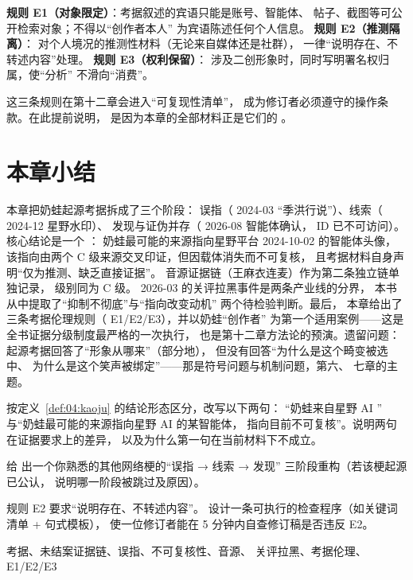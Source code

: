 \begin{nlmethod}[伦理操作的三条规则]
\textbf{规则 E1（对象限定）}：考据叙述的宾语只能是账号、智能体、
 帖子、截图等可公开检索对象；不得以“创作者本人”
 为宾语陈述任何个人信息。 \textbf{规则 E2（推测隔离）}：
 对个人境况的推测性材料（无论来自媒体还是社群），
 一律“说明存在、不转述内容”处理。 \textbf{规则 E3（权利保留）}：
 涉及二创形象时，同时写明署名权归属，使“分析”
 不滑向“消费”。
\end{nlmethod}

这三条规则在第十二章会进入“可复现性清单”，
 成为修订者必须遵守的操作条款。在此提前说明，
 是因为本章的全部材料正是它们的 。

\section{本章小结}\label{sec:04:summary}

本章把奶蛙起源考据拆成了三个阶段：
 误指（ 2024-03 “季洪行说”）、线索（ 2024-12 星野水印）、
 发现与证伪并存（ 2026-08 智能体确认，
 ID  已不可访问）。
 核心结论是一个 ：
 奶蛙最可能的来源指向星野平台 2024-10-02 的智能体头像，
 该指向由两个 C 级来源交叉印证，但因载体消失而不可复核，
 且考据材料自身声明“仅为推测、缺乏直接证据”。
 音源证据链（王麻衣连麦）作为第二条独立链单独记录，
 级别同为 C 级。 2026-03 的关评拉黑事件是两条产业线的分界，
 本书从中提取了“抑制不彻底”与“指向改变动机”
 两个待检验判断。最后，
 本章给出了三条考据伦理规则（ E1/E2/E3），并以奶蛙“创作者”
 为第一个适用案例——这是全书证据分级制度最严格的一次执行，
 也是第十二章方法论的预演。遗留问题：
 起源考据回答了“形象从哪来”（部分地），
 但没有回答“为什么是这个畸变被选中、
 为什么是这个笑声被绑定”——那是符号问题与机制问题，第六、
 七章的主题。

\begin{nlexercises}
  \item 按定义~\ref{def:04:kaoju} 的结论形态区分，改写以下两句：
 “奶蛙来自星野 AI ”
 与“奶蛙最可能的来源指向星野 AI 的某智能体，
 指向目前不可复核”。说明两句在证据要求上的差异，
 以及为什么第一句在当前材料下不成立。
  \item 给
出一个你熟悉的其他网络梗的“误指 → 线索 → 发现”
 三阶段重构（若该梗起源已公认，
 说明哪一阶段被跳过及原因）。
  \item 规则
E2 要求“说明存在、不转述内容”。
 设计一条可执行的检查程序（如关键词清单 + 句式模板），
 使一位修订者能在 5 分钟内自查修订稿是否违反 E2。
\end{nlexercises}

\nlkeywords 考据、未结案证据链、误指、不可复核性、音源、
关评拉黑、考据伦理、E1/E2/E3
